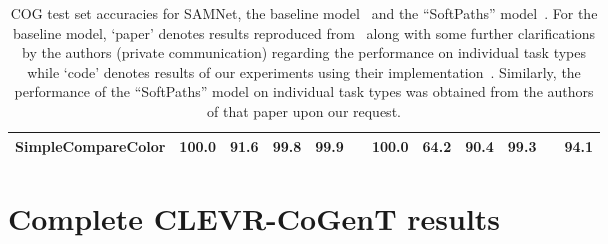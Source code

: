 \begin{table*}[htb]
\begin{adjustbox}{width=\columnwidth}
\begin{tabular}{l r r r r r r r r r r r}
			SimpleCompareColor    &    100.0    &    91.6    &    99.8    &    99.9    &    &    100.0    &    64.2    &    90.4    &    99.3    &   &    94.1    \\
			\bottomrule[1.25pt]
		\end{tabular}
	\end{adjustbox}
	\caption{COG test set accuracies for SAMNet, the baseline model~\cite{yang2018dataset} and the ``SoftPaths'' model~\cite{haurilet2019s}. For the baseline model, `paper' denotes results reproduced from~\cite{yang2018dataset} along with some further clarifications by the authors (private communication)  regarding the performance on individual task types while `code' denotes results of our experiments using their implementation~\cite{yang2018implement}. Similarly, the performance of  the ``SoftPaths'' model on individual task types was obtained from the authors of that paper upon our request.} 
    \label{tab:all-results}
\end{table*}


\clearpage
\section{Complete CLEVR-CoGenT results}
\label{sec:full-cogent-results}

